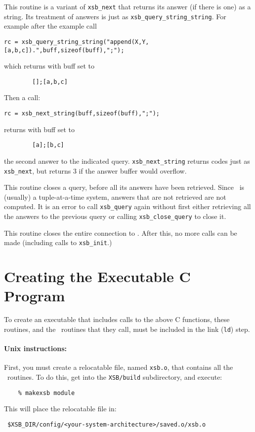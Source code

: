 \begin{description}
   This routine is a variant of {\tt xsb\_next} that
returns its answer (if there is one) as a string.  Its treatment of
answers is just as {\tt xsb\_query\_string\_string}.  For example after
the example call 
\begin{verbatim}
rc = xsb_query_string_string("append(X,Y,[a,b,c]).",buff,sizeof(buff),";");
\end{verbatim}
which returns with buff set to 
\begin{verbatim}
        [];[a,b,c]
\end{verbatim}
Then a call:
\begin{verbatim}
rc = xsb_next_string(buff,sizeof(buff),";");
\end{verbatim}
returns with buff set to 
\begin{verbatim}
        [a];[b,c]
\end{verbatim}
the second answer to the indicated query. {\tt xsb\_next\_string}
returns codes just as {\tt xsb\_next}, but returns 3 if the answer
buffer would overflow.

 
This routine closes a query, before all its answers have been
retrieved.  Since \ourprolog\ is (usually) a tuple-at-a-time system,
answers that are not retrieved are not computed.
It is an error to call {\tt xsb\_query} again without
first either retrieving all the answers to the previous query or
calling {\tt xsb\_close\_query} to close it.

 
This routine closes the entire connection to \ourprolog .  After this,
no more calls can be made (including calls to {\tt xsb\_init}.)

\end{description}

\section{Creating the Executable C Program}

To create an executable that includes calls to the above C functions,
these routines, and the \ourprolog\ routines that they call, must be
included in the link ({\tt ld}) step.

\paragraph{Unix instructions:}
First, you must create a relocatable file, named {\tt xsb.o}, that
contains all the \ourprolog\ routines.  To do this, get into the
{\tt XSB/build} subdirectory, and execute:
\begin{verbatim}
    % makexsb module
\end{verbatim}
This will place the relocatable file in:
\begin{verbatim}
 $XSB_DIR/config/<your-system-architecture>/saved.o/xsb.o  
\end{verbatim}

